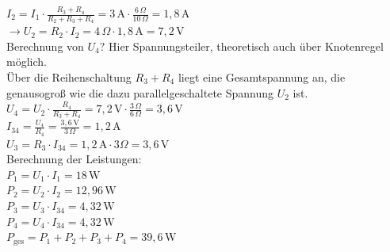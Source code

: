 {\begin{enumerate}[label=\alph*)]
        $I_2 = I_1 \cdot \frac{R_3 + R_4}{R_2 + R_3 + R_4} = 3 \, \mathrm{A} \cdot \frac{6 \, \Omega}{10 \, \Omega} = 1,8 \, \mathrm{A}$\\

        $\rightarrow U_2 = R_2 \cdot I_2 = 4 \, \Omega \cdot 1,8 \, \mathrm{A} = 7,2 \, \mathrm{V}$\\

        Berechnung von $U_4?$ Hier Spannungsteiler, theoretisch auch über Knotenregel möglich.\\

        Über die Reihenschaltung $R_3 + R_4$ liegt eine Gesamtspannung an, die genausogroß wie die dazu parallelgeschaltete Spannung $U_2$ ist.\\

        $U_4 = U_2 \cdot \frac{R_4}{R_3 + R_4} = 7,2 \, \mathrm{V} \cdot \frac{3 \, \Omega}{6 \, \Omega} = 3,6 \, \mathrm{V}$\\

        $I_{34} = \frac{U_4}{R_4} = \frac{3,6 \, \mathrm{V}}{3 \, \Omega} = 1,2 \, \mathrm{A}$\\

        $U_3 = R_3 \cdot I_{34} = 1,2 \, \mathrm{A} \cdot 3 \Omega = 3,6 \, \mathrm{V}$\\

        Berechnung der Leistungen:\\

        $P_1 = U_1 \cdot I_1 = 18 \, \mathrm{W} $\\

        $P_2 = U_2 \cdot I_2 = 12,96 \, \mathrm{W} $\\

        $P_3 = U_3 \cdot I_{34} = 4,32 \, \mathrm{W} $\\

        $P_4 = U_4 \cdot I_{34} = 4,32 \, \mathrm{W} $\\

        $P_\mathrm{ges} = P_1 + P_2 + P_3 + P_4 = 39,6 \, \mathrm{W}$










        
    \end{enumerate}  
}